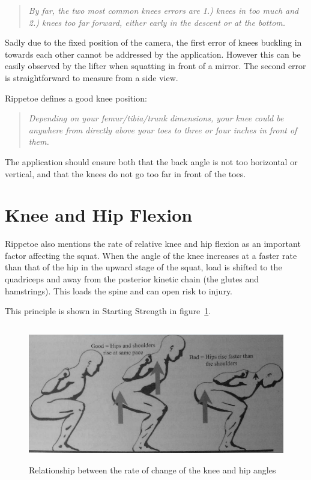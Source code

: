 \begin{quote}
\emph{By far, the two most common knees errors are 1.) knees in too much and 2.) knees too far forward, either early in the descent or at the bottom.}
\end{quote}

Sadly due to the fixed position of the camera, the first error of knees buckling in towards each other cannot be addressed by the application. However this can be easily observed by the lifter when squatting in front of a mirror. The second error is straightforward to measure from a side view.

Rippetoe defines a good knee position:

\begin{quote}
\emph{Depending on your femur/tibia/trunk dimensions, your knee could be anywhere from directly above your toes to three or four inches in front of them.}
\end{quote}

The application should ensure both that the back angle is not too horizontal or vertical, and that the knees do not go too far in front of the toes.

\section{Knee and Hip Flexion}

Rippetoe also mentions the rate of relative knee and hip flexion as an important factor affecting the squat. When the angle of the knee increases at a faster rate than that of the hip in the upward stage of the squat, load is shifted to the quadriceps and away from the posterior kinetic chain (the glutes and hamstrings). This loads the spine and can open risk to injury.

This principle is shown in Starting Strength in figure~\ref{fig:rippetoe_flexion}.

\begin{figure}[H]
    \centering
	\includegraphics[height=6cm]{squat/images/rippetoe_knee_hip_flexion}
\caption{Relationship between the rate of change of the knee and hip angles}
\label{fig:rippetoe_flexion}
\end{figure}

